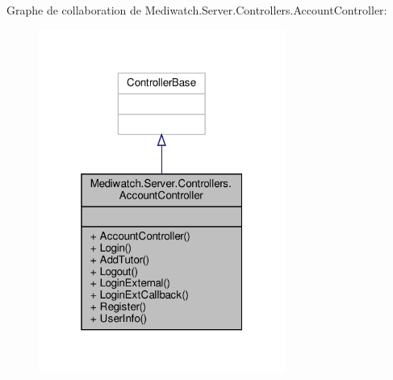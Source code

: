 Graphe de collaboration de Mediwatch.\+Server.\+Controllers.\+Account\+Controller\+:
\nopagebreak
\begin{figure}[H]
\begin{center}
\leavevmode
\includegraphics[width=229pt]{class_mediwatch_1_1_server_1_1_controllers_1_1_account_controller__coll__graph}
\end{center}
\end{figure}
